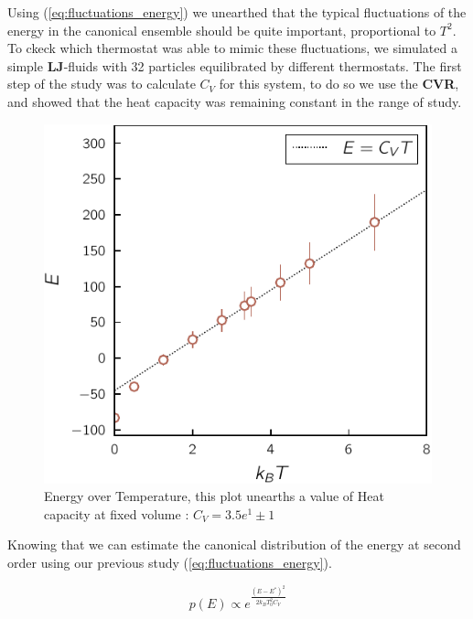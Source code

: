 \documentclass[ansiapaper]{report}
\begin{document}
\begin{multicols}{3}
Using (\ref{eq:fluctuations_energy}) we unearthed that the typical fluctuations of the energy in the canonical ensemble should be quite important, proportional to $T^2$. To ckeck which thermostat was able to mimic these fluctuations, we simulated a simple \textbf{LJ}-fluids with 32 particles equilibrated by different thermostats. The first step of the study was to calculate $C_V$ for this system, to do so we use the \textbf{CVR}, and showed that the heat capacity was remaining constant in the range of study. 
\begin{figure}[H]
    \begin{center}
        \includegraphics[width=1\linewidth]{figures/MD_energy_temperature.pdf}
    \end{center}
    \caption{Energy over Temperature, this plot unearths a value of Heat capacity at fixed volume : $C_V = 3.5e^1 \pm 1$}\label{fig:HC}
\end{figure}

Knowing that we can estimate the canonical distribution of the energy at second order using our previous study (\ref{eq:fluctuations_energy}).

$$ p(E) \propto e^{\frac{(E - E^*)^2}{2 k_B T_0^2 C_V}}$$


\end{multicols}
\end{document}
